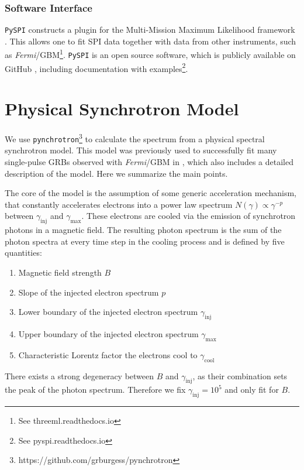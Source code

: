 \documentclass[twocolumn,traditabstract]{aa}
\begin{document}
\subsubsection{Software Interface}

{\tt PySPI} constructs a plugin for the Multi-Mission Maximum Likelihood framework \citep[3ML][]{3ML}. This allows one to fit SPI data together with data from other instruments, such as \textit{Fermi}/GBM\footnote{See threeml.readthedocs.io}. {\tt PySPI} is an open source software, which is publicly available on GitHub \citep{joss}, including documentation with examples\footnote{See pyspi.readthedocs.io}.

\section{Physical Synchrotron Model}
\label{synch}
We use {\tt pynchrotron}\footnote{https://github.com/grburgess/pynchrotron} to calculate the spectrum from a physical spectral synchrotron model. This model was previously used to successfully fit many single-pulse GRBs observed with \textit{Fermi}/GBM in \citet{synch}, which also includes a detailed description of the model. Here we summarize the main points.

The core of the model is the assumption of some generic acceleration mechanism, that constantly accelerates electrons into a power law spectrum $N(\gamma )\propto \gamma^{-p}$ between $\gamma_{\textrm{inj}}$ and $\gamma_{\textrm{max}}$. These electrons are cooled via the emission of synchrotron photons in a magnetic field. The resulting photon spectrum is the sum of the photon spectra at every time step in the cooling process and is defined by five quantities:

\begin{enumerate}
  \vspace{-0.2cm}
	\item Magnetic field strength $B$
  \item Slope of the injected electron spectrum $p$
  \item Lower boundary of the injected electron spectrum $\gamma_{\mathrm{inj}}$
  \item Upper boundary of the injected electron spectrum $\gamma_{\mathrm{max}}$
  \item Characteristic Lorentz factor the electrons cool to $\gamma_{\mathrm{cool}}$
\end{enumerate}

\noindent
There exists a strong degeneracy between $B$ and $\gamma_{\mathrm{inj}}$, as their combination sets the peak of the photon spectrum. Therefore we fix $\gamma_{\mathrm{inj}}=10^{5}$ and only fit for $B$.
\end{document}
